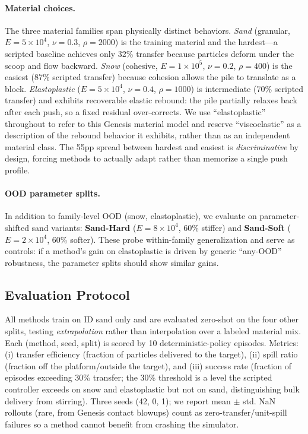 \paragraph{Material choices.}
The three material families span physically distinct behaviors. \emph{Sand} (granular, $E=5 \times 10^4$, $\nu=0.3$, $\rho=2000$) is the training material and the hardest---a scripted baseline achieves only 32\% transfer because particles deform under the scoop and flow backward. \emph{Snow} (cohesive, $E=1 \times 10^5$, $\nu=0.2$, $\rho=400$) is the easiest (87\% scripted transfer) because cohesion allows the pile to translate as a block. \emph{Elastoplastic} ($E=5 \times 10^4$, $\nu=0.4$, $\rho=1000$) is intermediate (70\% scripted transfer) and exhibits recoverable elastic rebound: the pile partially relaxes back after each push, so a fixed residual over-corrects. We use ``elastoplastic'' throughout to refer to this Genesis material model and reserve ``viscoelastic'' as a description of the rebound behavior it exhibits, rather than as an independent material class. The 55pp spread between hardest and easiest is \emph{discriminative} by design, forcing methods to actually adapt rather than memorize a single push profile.

\paragraph{OOD parameter splits.}
In addition to family-level OOD (snow, elastoplastic), we evaluate on parameter-shifted sand variants: \textbf{Sand-Hard} ($E=8 \times 10^4$, 60\% stiffer) and \textbf{Sand-Soft} ($E=2 \times 10^4$, 60\% softer). These probe within-family generalization and serve as controls: if a method's gain on elastoplastic is driven by generic ``any-OOD'' robustness, the parameter splits should show similar gains.

\subsection{Evaluation Protocol}

All methods train on ID sand only and are evaluated zero-shot on the four other splits, testing \emph{extrapolation} rather than interpolation over a labeled material mix. Each (method, seed, split) is scored by 10 deterministic-policy episodes. Metrics: (i) transfer efficiency (fraction of particles delivered to the target), (ii) spill ratio (fraction off the platform/outside the target), and (iii) success rate (fraction of episodes exceeding 30\% transfer; the 30\% threshold is a level the scripted controller exceeds on snow and elastoplastic but not on sand, distinguishing bulk delivery from stirring). Three seeds (42, 0, 1); we report mean $\pm$ std. NaN rollouts (rare, from Genesis contact blowups) count as zero-transfer/unit-spill failures so a method cannot benefit from crashing the simulator.

